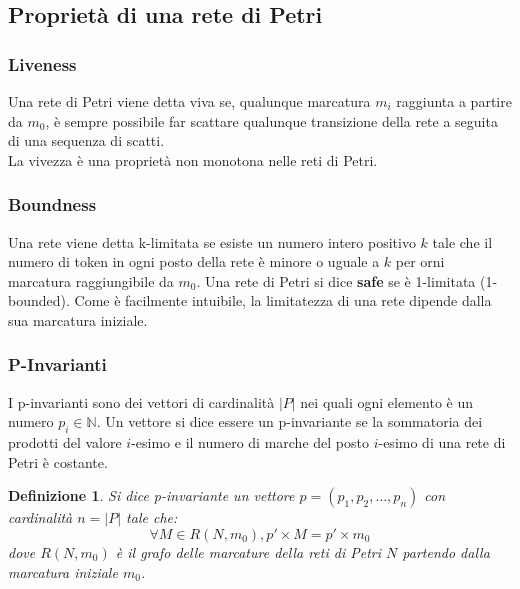 \documentclass[italian,12pt]{book}
\newtheorem{mydef}{Definizione}
\begin{document}
\subsection{Proprietà di una rete di Petri}
\subsubsection{Liveness}
Una rete di Petri viene detta viva se, qualunque marcatura $m_i$
raggiunta a partire da $m_0$, è sempre possibile far scattare
qualunque transizione della rete a seguita di una sequenza di
scatti. \\
La vivezza è una proprietà non monotona nelle reti di Petri.

\subsubsection{Boundness}
Una rete viene detta k-limitata se esiste un numero intero positivo
$k$  tale che il numero di token in ogni posto della rete è minore o
uguale a $k$ per orni marcatura raggiungibile da $m_0$. Una rete di
Petri si dice {\bf safe} se è 1-limitata (1-bounded). Come è
facilmente intuibile, la limitatezza di una rete dipende dalla sua
marcatura iniziale.

\subsubsection{P-Invarianti}
I p-invarianti sono dei vettori di cardinalità $|P|$ nei quali ogni
elemento è un numero $p_i \in \mathbb{N}$. Un vettore si dice essere
un p-invariante se la sommatoria dei prodotti del valore $i$-esimo e
il numero di marche del posto $i$-esimo di una rete di Petri è
costante.
\begin{mydef}
Si dice p-invariante un vettore $p = (p_1, p_2, \dots, p_n)$ con
cardinalità $n = |P|$ tale che:
\[ \forall M \in R(N, m_0) , p\prime \times M = p\prime \times m_0 \]
dove $R(N, m_0)$ è il grafo delle marcature della reti di Petri $N$
partendo dalla marcatura iniziale $m_0$.
\end{mydef}

\end{document}
